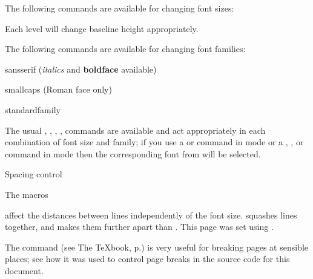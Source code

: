 \incindent

The following commands are available for changing font sizes:

\incindent\closeup

\smallerfonts {}

\smallfonts {}

\standardsizefonts {}

\largefonts {}

\largerfonts {}

\standardsizefonts\decindent\endcloseup

Each level will change baseline height appropriately.

\filbreak The following commands are available for changing font families:

\incindent\closeup

\sansserif \texcmd{}sansserif ({\it italics} and {\bf boldface} available)

\smallcaps \texcmd{}smallcaps (Roman face only)

\standardfamily \texcmd{}standardfamily

\endcloseup\decindent

\filbreak 
The usual , , , , 
commands are available and act appropriately in each combination of font size
and family; if you use a  or  command in
 mode or a , ,  or
 command in  mode then the corresponding font from
 will be selected. 


\talllines
\filbreak Spacing control

\incindent

The macros

\incindent\closeup




\endcloseup\decindent

\filbreak 
affect the distances between lines independently of the font size.
 squashes lines together, and  makes
them further apart than .  This page was set using
.

\filbreak
The command  (see The \TeX book, p.) is very
useful for breaking pages at sensible places; see how it was used to control
page breaks in the source code for this document.


